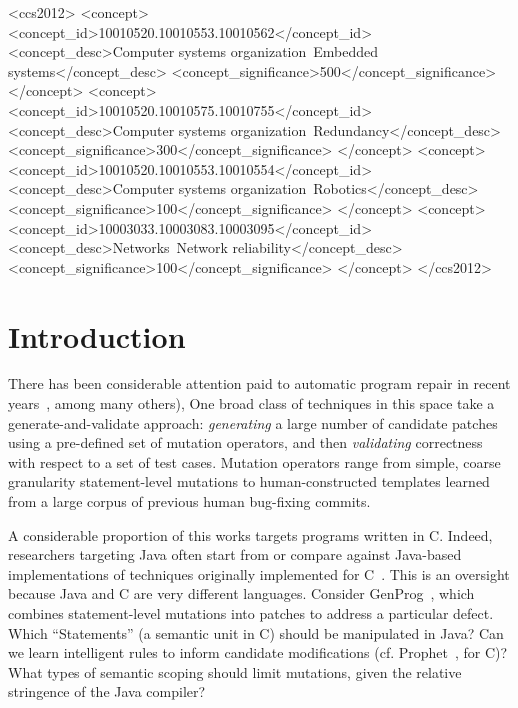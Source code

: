 \documentclass{sig-alternate-05-2015}
\begin{document}
%
%
\begin{CCSXML}
<ccs2012>
 <concept>
  <concept_id>10010520.10010553.10010562</concept_id>
  <concept_desc>Computer systems organization~Embedded systems</concept_desc>
  <concept_significance>500</concept_significance>
 </concept>
 <concept>
  <concept_id>10010520.10010575.10010755</concept_id>
  <concept_desc>Computer systems organization~Redundancy</concept_desc>
  <concept_significance>300</concept_significance>
 </concept>
 <concept>
  <concept_id>10010520.10010553.10010554</concept_id>
  <concept_desc>Computer systems organization~Robotics</concept_desc>
  <concept_significance>100</concept_significance>
 </concept>
 <concept>
  <concept_id>10003033.10003083.10003095</concept_id>
  <concept_desc>Networks~Network reliability</concept_desc>
  <concept_significance>100</concept_significance>
 </concept>
</ccs2012>  
\end{CCSXML}


%
%

%
%
\printccsdesc



\section{Introduction}

There has been considerable attention paid to automatic
program repair in recent
years~\cite{kim2013,legoues2012,pan2009,
  Mechtaev15,Long2016}, among many others),
%
One broad class of techniques in this space take a generate-and-validate
approach: \emph{generating} a large number of candidate patches using a
pre-defined set of mutation operators, and then \emph{validating} correctness with
respect to a set of test cases.  Mutation operators range from simple, coarse
granularity statement-level mutations to human-constructed templates learned
from a large corpus of previous human bug-fixing commits.

A considerable proportion of this works targets programs written in C.
Indeed, researchers targeting Java often start from or compare against
Java-based implementations of techniques originally
implemented for C~\cite{nopol,kim2013}. %
%
This is an oversight because Java and C are very different languages.
Consider GenProg~\cite{legoues2012}, which
combines statement-level mutations into patches to address a particular
defect. Which ``Statements'' (a semantic unit in C) should be manipulated in Java?
Can we learn
intelligent rules to inform candidate modifications
(cf. Prophet~\cite{Long2016}, for C)?  What types of semantic scoping
should limit mutations, given the relative stringence of the Java
compiler?
\end{document}
